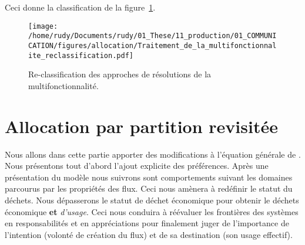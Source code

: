 Ceci donne la classification de la figure~\ref{fig:MULTIFONCTIONNATLITE_REclassification}.
\begin{figure}[htbp]
\texttt{[image: /home/rudy/Documents/rudy/01\_These/11\_production/01\_COMMUNICATION/figures/allocation/Traitement\_de\_la\_multifonctionnalite\_reclassification.pdf]}
\caption{Re-classification des approches de résolutions de la multifonctionnalité.}
\label{fig:MULTIFONCTIONNATLITE_REclassification}
\end{figure}

\section{Allocation par partition revisitée}
\label{sec:partitionning}
Nous allons dans cette partie apporter des modifications à l'équation générale de \citeauthor{majeau-bettez_unified_2014}.
Nous présentons tout d'abord l'ajout explicite des préférences.
Après une présentation du modèle nous suivrons sont comportements suivant les domaines parcourus par les propriétés des flux.
Ceci nous amènera à redéfinir le statut du déchets.
Nous dépasserons le statut de déchet économique pour obtenir le déchets économique \textbf{et} \emph{d'usage}.
Ceci nous conduira à réévaluer les frontières des systèmes en responsabilités et en appréciations pour finalement juger de l'importance de l'intention (volonté de création du flux) et de sa destination (son usage effectif).

